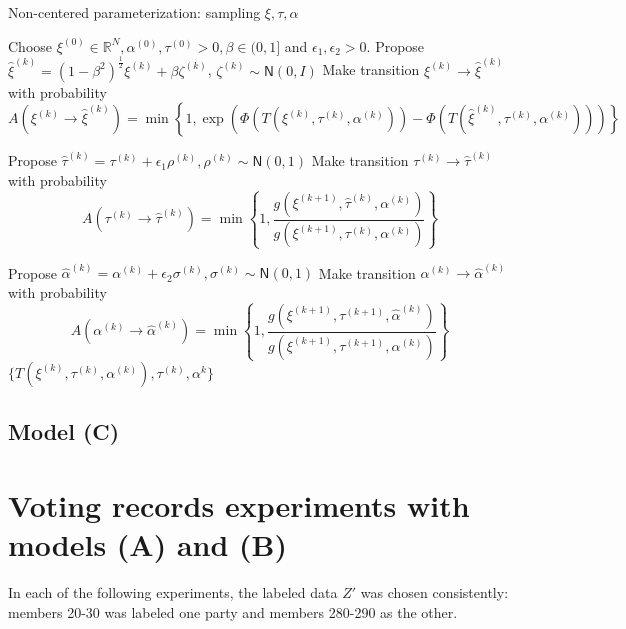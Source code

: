 \documentclass{siamart1116}
\begin{document}
        \begin{algorithm}
        \caption{Non-centered parameterization: sampling $\xi, \tau, \alpha$}
        \label{alg:xi_tau_alpha}
        \begin{algorithmic}
        \State Choose $\xi^{(0)} \in \mathbb{R}^N, \alpha^{(0)}, \tau^{(0)} > 0, \beta \in (0, 1]$ and $\epsilon_1, \epsilon_2 > 0$.
        \State Propose $\hat\xi^{(k)} = (1-\beta^2)^{\frac{1}{2}}\xi^{(k)} + \beta \zeta^{(k)}$, $\zeta^{(k)} \sim \mathsf{N}(0, I)$
        \State Make transition $\xi^{(k)} \to \hat\xi^{(k)}$ with probability
        \[ A(\xi^{(k)} \to \hat\xi^{(k)}) = \min\left\{1, \exp\left(\Phi(T(\xi^{(k)},\tau^{(k)},\alpha^{(k)})) - \Phi(T(\hat\xi^{(k)},\tau^{(k)},\alpha^{(k)}))\right) \right\}\] 

        \State Propose $\hat\tau^{(k)} = \tau^{(k)} + \epsilon_1 \rho^{(k)}, \rho^{(k)} \sim \mathsf{N}(0,1)$
        \State Make transition $\tau^{(k)} \to \hat\tau^{(k)}$ with probability
        \[ A(\tau^{(k)} \to \hat\tau^{(k)}) = \min\left\{1, \frac{g(\xi^{(k+1)},\hat\tau^{(k)},\alpha^{(k)})}{g(\xi^{(k+1)},\tau^{(k)},\alpha^{(k)})} \right\}\] 

        \State Propose $\hat\alpha^{(k)} = \alpha^{(k)} + \epsilon_2 \sigma^{(k)}, \sigma^{(k)} \sim \mathsf{N}(0,1)$
        \State Make transition $\alpha^{(k)} \to \hat\alpha^{(k)}$ with probability
        \[ A(\alpha^{(k)} \to \hat\alpha^{(k)}) = \min\left\{1, \frac{g(\xi^{(k+1)},\tau^{(k+1)},\hat \alpha^{(k)})}{g(\xi^{(k+1)},\tau^{(k+1)},\alpha^{(k)})} \right\}\]
        \EndFor
        \State \Return $\{ T(\xi^{(k)},\tau^{(k)},\alpha^{(k)}), \tau^{(k)}, \alpha^{k} \}$
        \end{algorithmic}
        \end{algorithm}

    \subsection{Model (C)}

\section{Voting records experiments with models (A) and (B)}
    In each of the following experiments, the labeled data $Z'$ was chosen consistently: members 20-30 was labeled one party and members 280-290 as the other.
\end{document}
